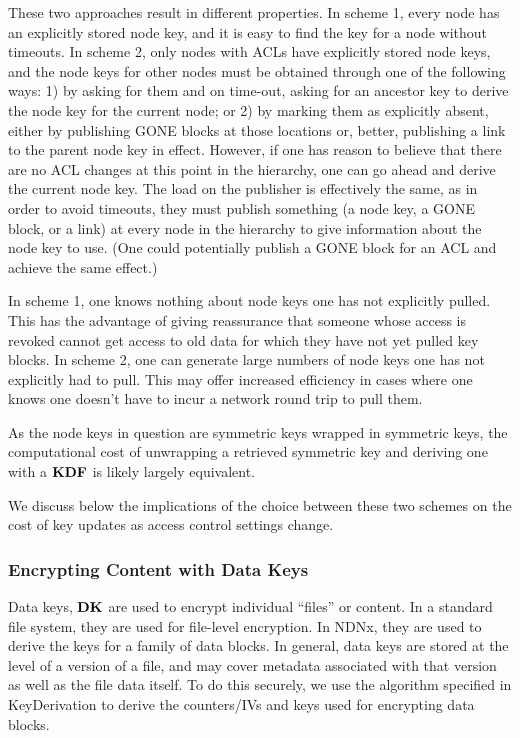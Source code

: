 These two approaches result in different properties. In scheme 1,
every node has an explicitly stored node key, and it is easy to find
the key for a node without timeouts. In scheme 2, only nodes with ACLs
have explicitly stored node keys, and the node keys for other nodes
must be obtained through one of the following ways: 1) by asking for
them and on time-out, asking for an ancestor key to derive the node
key for the current node; or 2) by marking them as explicitly absent,
either by publishing GONE blocks at those locations or, better,
publishing a link to the parent node key in effect. However, if one
has reason to believe that there are no ACL changes at this point in
the hierarchy, one can go ahead and derive the current node key. The
load on the publisher is effectively the same, as in order to avoid
timeouts, they must publish something (a node key, a GONE block, or a
link) at every node in the hierarchy to give information about the
node key to use. (One could potentially publish a GONE block for an
ACL and achieve the same effect.)

In scheme 1, one knows nothing about node keys one has not explicitly
pulled. This has the advantage of giving reassurance that someone
whose access is revoked cannot get access to old data for which they
have not yet pulled key blocks. In scheme 2, one can generate large
numbers of node keys one has not explicitly had to pull. This may
offer increased efficiency in cases where one knows one doesn't have
to incur a network round trip to pull them.

As the node keys in question are symmetric keys wrapped in symmetric
keys, the computational cost of unwrapping a retrieved symmetric key
and deriving one with a ${\textbf{KDF}}$ is likely largely equivalent.

We discuss below the implications of the choice between these two
schemes on the cost of key updates as access control settings change.

\subsubsection{Encrypting Content with Data Keys}

Data keys, ${\textbf{DK}}$ are used to encrypt individual ``files'' or
content. In a standard file system, they are used for file-level
encryption. In NDNx, they are used to derive the keys for a family of
data blocks. In general, data keys are stored at the level of a
version of a file, and may cover metadata associated with that version
as well as the file data itself. To do this securely, we use the
algorithm specified in KeyDerivation to derive the counters/IVs and
keys used for encrypting data blocks.

